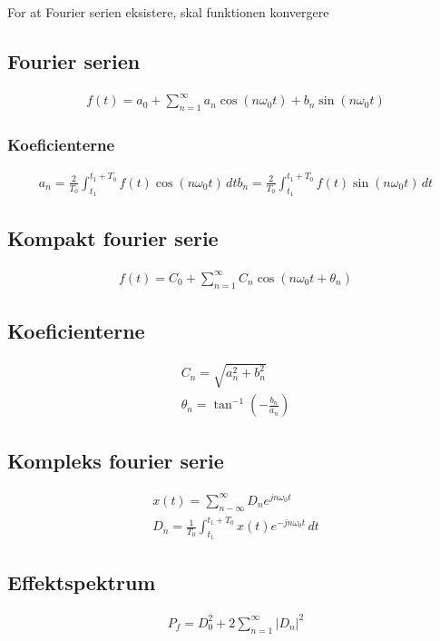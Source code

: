 For at Fourier serien eksistere, skal funktionen konvergere
\subsection{Fourier serien}
	\begin{align}
		f(t)=a_0+\sum_{n=1}^{\infty}a_n\cos(n\omega_0t)+b_n\sin(n\omega_0t)
	\end{align}
	\subsubsection{Koeficienterne}
		\begin{align}
			a_n=\frac{2}{T_0}\int_{t_1}^{t_1+T_0}f(t)\cos(n\omega_0 t)\,dt
			b_n=\frac{2}{T_0}\int_{t_1}^{t_1+T_0}f(t)\sin(n\omega_0 t)\,dt
		\end{align}

\subsection{Kompakt fourier serie}
	\begin{align}
		f(t)=C_0+\sum_{n=1}^{\infty}C_n\cos(n\omega_0t+\theta_n)
	\end{align}

	\subsection{Koeficienterne}
		\begin{align}
			C_n=\sqrt{a_n^2+b_n^2}\\
			\theta_n=\tan^{-1}\left(-\frac{b_n}{a_n}\right)
		\end{align}

\subsection{Kompleks fourier serie}
	\begin{align}
		x(t)=\sum_{n-\infty}^{\infty}D_ne^{jn\omega_0t}\\
		D_n=\frac{1}{T_0}\int_{t_1}^{t_1+T_0}x(t)e^{-jn\omega_0t}\,dt
	\end{align}

\subsection{Effektspektrum}
	\begin{align}
		P_f=D_0^2+2\sum_{n=1}^{\infty}|D_n|^2
	\end{align}